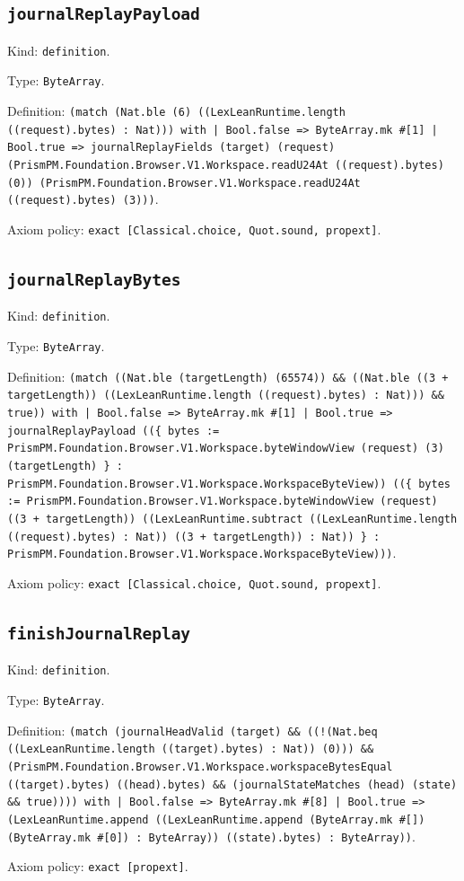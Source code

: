 \documentclass[11pt]{article}
\begin{document}
\subsection*{\texttt{journalReplayPayload}}
\noindent Kind: \texttt{definition}.\par
\noindent Type: \texttt{ByteArray}.\par
\noindent Definition: \texttt{(match (Nat.ble (6) ((LexLeanRuntime.length ((request).bytes) : Nat))) with | Bool.false => ByteArray.mk \#[1] | Bool.true => journalReplayFields (target) (request) (PrismPM.Foundation.Browser.V1.Workspace.readU24At ((request).bytes) (0)) (PrismPM.Foundation.Browser.V1.Workspace.readU24At ((request).bytes) (3)))}.\par
\noindent Axiom policy: \texttt{exact [Classical.choice, Quot.sound, propext]}.\par
\subsection*{\texttt{journalReplayBytes}}
\noindent Kind: \texttt{definition}.\par
\noindent Type: \texttt{ByteArray}.\par
\noindent Definition: \texttt{(match ((Nat.ble (targetLength) (65574)) \&\& ((Nat.ble ((3 + targetLength)) ((LexLeanRuntime.length ((request).bytes) : Nat))) \&\& true)) with | Bool.false => ByteArray.mk \#[1] | Bool.true => journalReplayPayload ((\{ bytes := PrismPM.Foundation.Browser.V1.Workspace.byteWindowView (request) (3) (targetLength) \} : PrismPM.Foundation.Browser.V1.Workspace.WorkspaceByteView)) ((\{ bytes := PrismPM.Foundation.Browser.V1.Workspace.byteWindowView (request) ((3 + targetLength)) ((LexLeanRuntime.subtract ((LexLeanRuntime.length ((request).bytes) : Nat)) ((3 + targetLength)) : Nat)) \} : PrismPM.Foundation.Browser.V1.Workspace.WorkspaceByteView)))}.\par
\noindent Axiom policy: \texttt{exact [Classical.choice, Quot.sound, propext]}.\par
\subsection*{\texttt{finishJournalReplay}}
\noindent Kind: \texttt{definition}.\par
\noindent Type: \texttt{ByteArray}.\par
\noindent Definition: \texttt{(match (journalHeadValid (target) \&\& ((!(Nat.beq ((LexLeanRuntime.length ((target).bytes) : Nat)) (0))) \&\& (PrismPM.Foundation.Browser.V1.Workspace.workspaceBytesEqual ((target).bytes) ((head).bytes) \&\& (journalStateMatches (head) (state) \&\& true)))) with | Bool.false => ByteArray.mk \#[8] | Bool.true => (LexLeanRuntime.append ((LexLeanRuntime.append (ByteArray.mk \#[]) (ByteArray.mk \#[0]) : ByteArray)) ((state).bytes) : ByteArray))}.\par
\noindent Axiom policy: \texttt{exact [propext]}.\par
\end{document}
